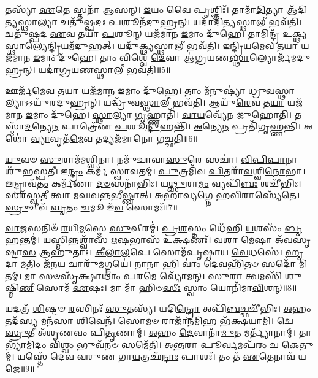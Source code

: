 𑌤𑌸𑍍𑌯𑌾᳴ \ul{𑌏}\-𑌤𑍇 𑌸𑍍𑌤𑌨𑌾᳴ 𑌆𑌸𑌨𑍍।
\-\ul{𑌇}\-𑌯𑌂 𑌵𑍈 𑌪𑍃𑌶𑍍𑌞𑌿𑌃᳴।
𑌤𑌾𑌮𑌾᳴\-\ul{𑌦𑌿}\-𑌤𑍍𑌯𑌾 𑌆᳴𑌦𑌿𑌤𑍍𑌯\-\ul{𑌸𑍍𑌥𑌾}\-𑌲𑍍𑌯𑌾 𑌚𑌤𑍁᳴𑌷𑍍𑌪𑌦𑌃 \ul{𑌪}\-𑌶𑍂𑌨᳴𑌦𑍁𑌹𑍍𑌰𑌨𑍍।
𑌯𑌦𑌾᳴𑌦𑌿𑌤𑍍𑌯\-\ul{𑌸𑍍𑌥𑌾}\-𑌲𑍀 𑌭𑌵᳴𑌤𑌿।
𑌚𑌤𑍁᳴𑌷𑍍𑌪𑌦 \ul{𑌏}\-𑌵 𑌤𑌯𑌾᳴ \ul{𑌪}\-𑌶𑍂𑌨𑍍 𑌯𑌜᳴𑌮𑌾𑌨 \ul{𑌇}\-𑌮𑌾𑌂 𑌦𑍁᳴𑌹𑍇।
𑌤𑌾𑌮𑌿𑌨𑍍𑌦𑍍𑌰᳴ 𑌉𑌕𑍍𑌥𑍍𑌯\-\ul{𑌸𑍍𑌥𑌾}\-𑌲𑍍𑌯𑍇\-\ul{𑌨𑍍𑌦𑍍𑌰𑌿}\-𑌯𑌮᳴𑌦𑍁𑌹𑌤𑍍।
𑌯𑌦𑍁᳴𑌕𑍍𑌥𑍍𑌯\-\ul{𑌸𑍍𑌥𑌾}\-𑌲𑍀 𑌭𑌵᳴𑌤𑌿।
\-\ul{𑌇}\-\-\ul{𑌨𑍍𑌦𑍍𑌰𑌿}\-𑌯\-\ul{𑌮𑍇}\-𑌵 𑌤\-\ul{𑌯𑌾} 𑌯𑌜᳴𑌮𑌾𑌨 \ul{𑌇}\-𑌮𑌾𑌂 𑌦𑍁᳴𑌹𑍇।
𑌤𑌾𑌂 𑌵𑌿𑌶𑍍𑌵𑍇᳴ \ul{𑌦𑍇}\-𑌵𑌾 𑌆॑𑌗𑍍𑌰𑌯𑌣\-\ul{𑌸𑍍𑌥𑌾}\-𑌲𑍍𑌯𑍋𑌰𑍍𑌜᳴𑌮𑌦𑍁𑌹𑍍𑌰𑌨𑍍।
𑌯𑌦𑌾॑𑌗𑍍𑌰𑌯𑌣\-\ul{𑌸𑍍𑌥𑌾}\-𑌲𑍀 𑌭𑌵᳴𑌤𑌿॥5॥

𑌊𑌰𑍍𑌜᳴\-\ul{𑌮𑍇}\-𑌵 𑌤\-\ul{𑌯𑌾} 𑌯𑌜᳴𑌮𑌾𑌨 \ul{𑌇}\-𑌮𑌾𑌂 𑌦𑍁᳴𑌹𑍇।
𑌤𑌾𑌂 𑌮᳴\-\ul{𑌨𑍁}\-𑌷𑍍𑌯𑌾॑ 𑌧𑍍𑌰𑍁𑌵\-\ul{𑌸𑍍𑌥𑌾}\-𑌲𑍍𑌯𑌾\-𑌽𑌽𑌯𑍁᳴𑌰𑌦𑍁𑌹𑍍𑌰𑌨𑍍।
𑌯𑌦𑍍𑌧𑍍𑌰𑍁᳴𑌵\-\ul{𑌸𑍍𑌥𑌾}\-𑌲𑍀 𑌭𑌵᳴𑌤𑌿।
𑌆𑌯𑍁᳴\-\ul{𑌰𑍇}\-𑌵 𑌤\-\ul{𑌯𑌾} 𑌯𑌜᳴𑌮𑌾𑌨 \ul{𑌇}\-𑌮𑌾𑌂 𑌦𑍁᳴𑌹𑍇।
\-\ul{𑌸𑍍𑌥𑌾}\-𑌲𑍍𑌯𑌾 \ul{𑌗𑍃}\-𑌹𑍍𑌣𑌾𑌤𑌿᳴।
\-\ul{𑌵𑌾}\-\-\ul{𑌯}\-𑌵𑍍𑌯𑍇᳴𑌨 𑌜𑍁𑌹𑍋𑌤𑌿।
𑌤𑌸𑍍𑌮𑌾᳴\-\ul{𑌦}\-𑌨𑍍𑌯𑍇\-\ul{𑌨} 𑌪𑌾𑌤𑍍𑌰𑍇᳴𑌣 \ul{𑌪}\-𑌶𑍂\-\ul{𑌨𑍍𑌦𑍁}\-𑌹𑌨𑍍𑌤𑌿᳴।
\-\ul{𑌅}\-𑌨𑍍𑌯𑍇\-\ul{𑌨} 𑌪𑍍𑌰𑌤𑌿᳴\-𑌗𑍃𑌹𑍍𑌣𑌨𑍍𑌤𑌿।
𑌅𑌥𑍋॑ \ul{𑌵𑍍𑌯𑌾}\-𑌵𑍃𑌤᳴\-\ul{𑌮𑍇}\-𑌵 𑌤𑌦𑍍𑌯𑌜᳴𑌮𑌾𑌨𑍋 𑌗𑌚𑍍𑌛𑌤𑌿॥6॥\anuvakamend[\-\ul{𑌗𑍍𑌰}\-\-\ul{𑌹}\-𑌤𑍍𑌵𑌂 𑌗𑍍𑌰𑌹𑌾𑌂॑ \ul{𑌜𑍁}\-𑌹𑍋𑌤𑍍𑌯᳴𑌕𑍁𑌰𑍍𑌵𑌤𑌾𑌦𑍁𑌹𑍍𑌰𑌨𑍍𑌨𑌾𑌗𑍍𑌰𑌯𑌣\-\ul{𑌸𑍍𑌥𑌾}\-𑌲𑍀 𑌭𑌵᳴\-\ul{𑌤𑌿} 𑌨𑌵᳴ 𑌚]

\-\ul{𑌯𑍁}\-𑌵𑍞 \ul{𑌸𑍁}\-𑌰𑌾𑌮᳴𑌮𑌶𑍍𑌵𑌿𑌨𑌾।
𑌨𑌮𑍁᳴𑌚𑌾𑌵𑌾\-\ul{𑌸𑍁}\-𑌰𑍇 𑌸𑌚𑌾॑।
\-\ul{𑌵𑌿}\-\-\ul{𑌪𑌿}\-\-\ul{𑌪𑌾}\-𑌨𑌾 𑌶𑍁᳴𑌭𑌸𑍍𑌪𑌤𑍀।
𑌇\-\ul{𑌨𑍍𑌦𑍍𑌰𑌂} 𑌕𑌰𑍍𑌮᳴ 𑌸𑍍𑌵𑌾𑌵𑌤𑌮𑍍।
\-\ul{𑌪𑍁}\-𑌤𑍍𑌰𑌮𑌿᳴𑌵 \ul{𑌪𑌿}\-𑌤𑌰𑌾᳴\-\ul{𑌵}\-𑌶𑍍𑌵𑌿\-\ul{𑌨𑍋}\-𑌭𑌾।
𑌇𑌨𑍍𑌦𑍍𑌰𑌾𑌵᳴\-\ul{𑌤𑌂} 𑌕𑌰𑍍𑌮᳴𑌣𑌾 \ul{𑌦}\-\-\ul{𑍞}\-𑌸𑌨𑌾᳴𑌭𑌿𑌃।
𑌯\-\ul{𑌥𑍍𑌸𑍁}\-𑌰𑌾\-\ul{𑌮𑌂} 𑌵𑍍𑌯𑌪𑌿᳴\-\ul{𑌬𑌃} 𑌶𑌚𑍀᳴𑌭𑌿𑌃।
𑌸𑌰᳴𑌸𑍍𑌵𑌤𑍀 𑌤𑍍𑌵𑌾 𑌮𑌘𑌵𑌨𑍍𑌨𑌭𑍀𑌷𑍍𑌣𑌾𑌤𑍍।
𑌅𑌹𑌾॑𑌵𑍍𑌯𑌗𑍍𑌨𑍇 \ul{𑌹}\-𑌵𑌿\-\ul{𑌰𑌾}\-𑌸𑍍𑌯𑍇᳴𑌤𑍇।
\-\ul{𑌸𑍍𑌰𑍁}\-𑌚𑍀𑌵᳴ \ul{𑌘𑍃}\-𑌤𑌂 \ul{𑌚}\-𑌮𑍂 𑌇᳴\-\ul{𑌵} 𑌸𑍋𑌮𑌃᳴॥7॥

\-\ul{𑌵𑌾}\-\-\ul{𑌜}\-𑌸𑌨𑌿𑍞᳴ \ul{𑌰}\-𑌯𑌿\-\ul{𑌮}\-𑌸𑍍𑌮𑍇 \ul{𑌸𑍁}\-𑌵𑍀𑌰𑌮𑍍॑।
\-\ul{𑌪𑍍𑌰}\-\-\ul{𑌶}\-𑌸𑍍𑌤𑌂 𑌧𑍇᳴𑌹𑌿 \ul{𑌯}\-𑌶𑌸𑌂᳴ \ul{𑌬𑍃}\-𑌹𑌨𑍍𑌤𑌮𑍍॑।
𑌯\-\ul{𑌸𑍍𑌮𑌿}\-𑌨𑍍𑌨𑌶𑍍𑌵𑌾᳴𑌸 𑌋\-\ul{𑌷}\-𑌭𑌾𑌸᳴ \ul{𑌉}\-𑌕𑍍𑌷𑌣𑌃᳴।
\-\ul{𑌵}\-𑌶𑌾 \ul{𑌮𑍇}\-𑌷𑌾 𑌅᳴𑌵\-\ul{𑌸𑍃}\-𑌷𑍍𑌟𑌾\-\ul{𑌸} 𑌆𑌹𑍁᳴𑌤𑌾𑌃।
\-\ul{𑌕𑍀}\-\-\ul{𑌲𑌾}\-\-\ul{𑌲}\-𑌪𑍇 𑌸𑍋𑌮᳴𑌪𑍃𑌷𑍍𑌠𑌾𑌯 \ul{𑌵𑍇}\-𑌧𑌸𑍇॑।
\-\ul{𑌹𑍃}\-𑌦𑌾 \ul{𑌮}\-𑌤𑌿𑌂 𑌜᳴𑌨\-\ul{𑌯} 𑌚𑌾𑌰𑍁᳴\-\ul{𑌮}\-𑌗𑍍𑌨𑌯𑍇॑।
𑌨𑌾\-\ul{𑌨𑌾} 𑌹𑌿 𑌵𑌾𑌂॑ \ul{𑌦𑍇}\-𑌵𑌹𑌿᳴\-\ul{𑌤}\-\-\ul{𑍞} 𑌸𑌦𑍋᳴ \ul{𑌮𑌿}\-𑌤𑌮𑍍।
𑌮𑌾 𑌸𑍞𑌸𑍃᳴𑌕𑍍𑌷𑌾𑌥𑌾𑌂 𑌪\-\ul{𑌰}\-𑌮𑍇 𑌵𑍍𑌯𑍋᳴𑌮𑌨𑍍।
𑌸𑍁\-\ul{𑌰𑌾} 𑌤𑍍𑌵𑌮𑌸𑌿᳴ \ul{𑌶𑍁}\-𑌷𑍍𑌮𑌿\-\ul{𑌣𑍀} 𑌸𑍋𑌮᳴ \ul{𑌏}\-𑌷𑌃।
𑌮𑌾 𑌮𑌾᳴ 𑌹𑌿𑍞\-\ul{𑌸𑍀𑌃} 𑌸𑍍𑌵𑌾𑌂 𑌯𑍋𑌨𑌿᳴𑌮𑌾\-\ul{𑌵𑌿}\-𑌶𑌨𑍍॥8॥

𑌯𑌦𑌤𑍍𑌰᳴ \ul{𑌶𑌿}\-𑌷𑍍𑌟𑍞 \ul{𑌰}\-𑌸𑌿𑌨𑌃᳴ \ul{𑌸𑍁}\-𑌤𑌸𑍍𑌯᳴।
𑌯𑌦𑌿\-\ul{𑌨𑍍𑌦𑍍𑌰𑍋} 𑌅𑌪𑌿᳴\-\ul{𑌬}\-𑌚𑍍𑌛𑌚𑍀᳴𑌭𑌿𑌃।
\-\ul{𑌅}\-𑌹𑌂 𑌤𑌦᳴\-\ul{𑌸𑍍𑌯} 𑌮𑌨᳴𑌸𑌾 \ul{𑌶𑌿}\-𑌵𑍇𑌨᳴।
𑌸𑍋\-\ul{𑌮}\-\-\ul{𑍞} 𑌰𑌾𑌜𑌾᳴𑌨\-\ul{𑌮𑌿}\-𑌹 𑌭᳴𑌕𑍍𑌷𑌯𑌾𑌮𑌿।
𑌦𑍍𑌵𑍇 \ul{𑌸𑍍𑌰𑍁}\-𑌤𑍀 𑌅᳴𑌶𑍃𑌣𑌵𑌂 𑌪𑌿\-\ul{𑌤𑍃}\-𑌣𑌾𑌮𑍍।
\-\ul{𑌅}\-𑌹𑌂 \ul{𑌦𑍇}\-𑌵𑌾𑌨𑌾᳴\-\ul{𑌮𑍁}\-𑌤 𑌮𑌰𑍍𑌤𑍍𑌯𑌾᳴𑌨𑌾𑌮𑍍।
𑌤𑌾𑌭𑍍𑌯𑌾᳴\-\ul{𑌮𑌿}\-𑌦𑌂 𑌵𑌿\-\ul{𑌶𑍍𑌵𑌂} 𑌭𑍁𑌵᳴\-\ul{𑌨}\-\-\ul{𑍞} 𑌸𑌮𑍇᳴𑌤𑌿।
\-\ul{𑌅}\-\-\ul{𑌨𑍍𑌤}\-𑌰𑌾 𑌪𑍂\-\ul{𑌰𑍍𑌵}\-𑌮𑌪᳴𑌰𑌂 𑌚 \ul{𑌕𑍇}\-𑌤𑍁𑌮𑍍।
𑌯𑌸𑍍𑌤𑍇᳴ 𑌦𑍇𑌵 𑌵𑌰𑍁𑌣 𑌗𑌾\-\ul{𑌯}\-𑌤𑍍𑌰𑌛᳴\-\ul{𑌨𑍍𑌦𑌾𑌃} 𑌪𑌾𑌶𑌃᳴।
𑌤𑌂 𑌤᳴ \ul{𑌏}\-𑌤𑍇𑌨𑌾𑌵᳴ 𑌯𑌜𑍇॥9॥


